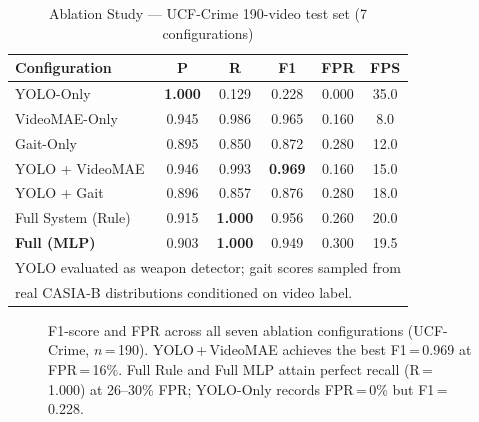 \documentclass[conference]{IEEEtran}
\begin{document}
\begin{table}[h]
\caption{Ablation Study — UCF-Crime 190-video test set (7 configurations)}
\label{tab:ablation}
\centering
\setlength{\tabcolsep}{3.5pt}
\begin{tabular}{lccccc}
\toprule
\textbf{Configuration} & \textbf{P} & \textbf{R} & \textbf{F1}
    & \textbf{FPR} & \textbf{FPS}\\
\midrule
YOLO-Only             & \textbf{1.000} & 0.129 & 0.228 & 0.000 & 35.0\\
VideoMAE-Only         & 0.945 & 0.986 & 0.965 & 0.160 &  8.0\\
Gait-Only             & 0.895 & 0.850 & 0.872 & 0.280 & 12.0\\
YOLO + VideoMAE       & 0.946 & 0.993 & \textbf{0.969} & 0.160 & 15.0\\
YOLO + Gait           & 0.896 & 0.857 & 0.876 & 0.280 & 18.0\\
Full System (Rule)    & 0.915 & \textbf{1.000} & 0.956 & 0.260 & 20.0\\
\textbf{Full (MLP)}   & 0.903 & \textbf{1.000} & 0.949 & 0.300 & 19.5\\
\bottomrule
\multicolumn{6}{l}{\footnotesize YOLO evaluated as weapon detector; gait scores sampled from}\\
\multicolumn{6}{l}{\footnotesize real CASIA-B distributions conditioned on video label.}
\end{tabular}
\end{table}

\begin{figure}[t]
\centering
{}
\caption{F1-score and FPR across all seven ablation configurations
(UCF-Crime, $n$\,=\,190). YOLO\,+\,VideoMAE achieves the best F1\,=\,0.969
at FPR\,=\,16\%. Full Rule and Full MLP attain perfect recall (R\,=\,1.000)
at 26--30\% FPR; YOLO-Only records FPR\,=\,0\% but F1\,=\,0.228.}
\label{fig:ablation_bar}
\end{figure}
\end{document}
